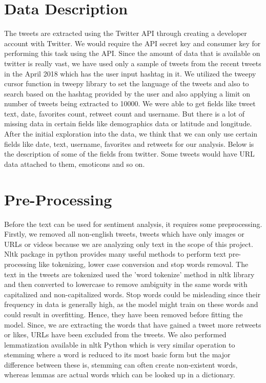 \section{Data Description}
The tweets are extracted using the Twitter API through creating a developer 
account with Twitter. We would require the API secret key and consumer 
key for performing this task using the API. Since the amount of data that 
is available on twitter is really vast, we have used only a sample of tweets 
from the recent tweets in the April 2018 which has the user input hashtag in it. 
We utilized the tweepy cursor function in tweepy library to set the language 
of the tweets and also to search based on the hashtag provided by the user 
and also applying a limit on number of tweets being extracted to 10000. 
We were able to get fields like tweet text, date, favorites count, retweet 
count and username. But there is a lot of missing data in certain fields like 
demographics data or latitude and longitude. After the initial exploration 
into the data, we think that we can only use certain fields like date, text, 
username, favorites and retweets for our analysis. Below is the description 
of some of the fields from twitter. Some tweets would have URL data attached to 
them, emoticons and so on.

\section{Pre-Processing}
Before the text can be used for sentiment analysis, it requires some preprocessing. 
Firstly, we removed all non-english tweets, tweets which have only images or URLs 
or videos because we are analyzing only text in the scope of this project. 
Nltk package in python provides many useful methods to perform text pre-processing 
like tokenizing, lower case conversion and stop words removal. The text in the tweets 
are tokenized used the ’word tokenize’ method in nltk library and then converted to 
lowercase to remove ambiguity in the same words with capitalized and 
non-capitalized words. Stop words could be misleading since their frequency 
in data is generally high, as the model might train on these words and could 
result in overfitting. Hence, they have been removed before fitting the model. 
Since, we are extracting the words that have gained a tweet more retweets or 
likes, URLs have been excluded from the tweets. We also performed lemmatization 
available in nltk Python which is very similar operation to stemming where a 
word is reduced to its most basic form but the major difference between these 
is, stemming can often create non-existent words, whereas lemmas are actual 
words which can be looked up in a dictionary. 

